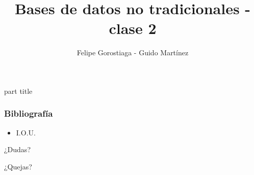 \documentclass[obeyspaces,spaces,hyphens]{beamer}
\begin{document}
\title{Bases de datos no tradicionales - clase 2}
\author{Felipe Gorostiaga - Guido Martínez}

\begin{frame}
  \titlepage
\end{frame}

\AtBeginSection{\frame{\sectionpage}}

{
	\begin{centering}
	\begin{beamercolorbox}[sep=12pt,center]{part title}
	\bf{\insertsection}\par
	\end{beamercolorbox}
	\end{centering}
}









\begin{frame}
\frametitle{Bibliografía}
\begin{itemize}
	\footnotesize
	\item I.O.U.
\end{itemize}
\end{frame}

\begin{frame}
\begin{center}
	¿Dudas?
	\pause

	¿Quejas?
\end{center}
\end{frame}
\end{document}
